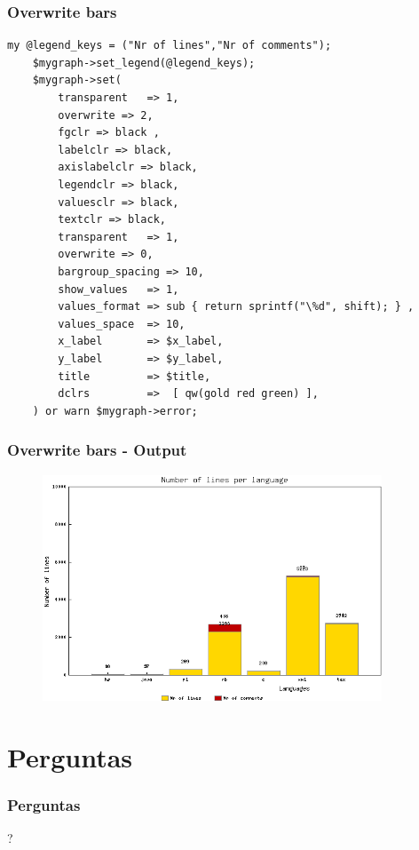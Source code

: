 \documentclass{beamer}
\begin{document}
\begin{frame}[fragile] \frametitle{Overwrite bars}
\begin{lstlisting}[language=perl_u,breaklines=true]
    my @legend_keys = ("Nr of lines","Nr of comments");
    $mygraph->set_legend(@legend_keys);
    $mygraph->set(
        transparent   => 1,
        overwrite => 2,
        fgclr => black ,
        labelclr => black,
        axislabelclr => black,
        legendclr => black,
        valuesclr => black,
        textclr => black,
        transparent   => 1,
        overwrite => 0,
        bargroup_spacing => 10,
        show_values   => 1,
        values_format => sub { return sprintf("\%d", shift); } ,
        values_space  => 10,
        x_label       => $x_label,
        y_label       => $y_label,
        title         => $title,
        dclrs         =>  [ qw(gold red green) ],
    ) or warn $mygraph->error;
\end{lstlisting}
\end{frame}

\begin{frame}[fragile] \frametitle{Overwrite bars - Output}
\begin{figure}[htbp]
\begin{center}
\includegraphics[width=0.9\textwidth]{image/image_LinesPerLanguage.png}
\end{center}
\end{figure}
\end{frame}
\section*{Perguntas}
\begin{frame} \frametitle{Perguntas}
\begin{center}\huge{?}\end{center}
\end{frame}
\end{document}
